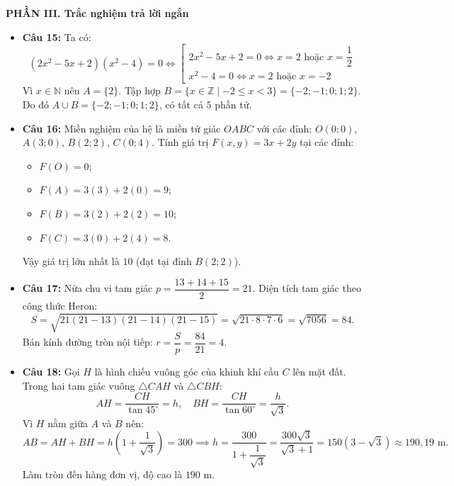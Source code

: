 \documentclass[12pt,a4paper]{article}
\begin{document}
\vspace{0.2cm}
\textbf{PHẦN III. Trắc nghiệm trả lời ngắn}
\begin{itemize}[leftmargin=0.6cm, itemsep=3pt]
    \item \textbf{Câu 15:} Ta có:
    \[
    (2x^2 - 5x + 2)(x^2 - 4) = 0 \iff \left[\begin{array}{l} 2x^2 - 5x + 2 = 0 \iff x = 2 \text{ hoặc } x = \dfrac{1}{2} \\ x^2 - 4 = 0 \iff x = 2 \text{ hoặc } x = -2 \end{array}\right.
    \]
    Vì $x \in \mathbb{N}$ nên $A = \{2\}$.
    Tập hợp $B = \{x \in \mathbb{Z} \mid -2 \le x < 3\} = \{-2; -1; 0; 1; 2\}$.
    Do đó $A \cup B = \{-2; -1; 0; 1; 2\}$, có tất cả $5$ phần tử.
    \item \textbf{Câu 16:} Miền nghiệm của hệ là miền tứ giác $OABC$ với các đỉnh:
    $O(0; 0)$, $A(3; 0)$, $B(2; 2)$, $C(0; 4)$.
    Tính giá trị $F(x, y) = 3x + 2y$ tại các đỉnh:
    \begin{itemize}
        \item $F(O) = 0$;
        \item $F(A) = 3(3) + 2(0) = 9$;
        \item $F(B) = 3(2) + 2(2) = 10$;
        \item $F(C) = 3(0) + 2(4) = 8$.
    \end{itemize}
    Vậy giá trị lớn nhất là $10$ (đạt tại đỉnh $B(2; 2)$).
    \item \textbf{Câu 17:} Nửa chu vi tam giác $p = \dfrac{13 + 14 + 15}{2} = 21$.
    Diện tích tam giác theo công thức Heron:
    \[
    S = \sqrt{21(21 - 13)(21 - 14)(21 - 15)} = \sqrt{21 \cdot 8 \cdot 7 \cdot 6} = \sqrt{7056} = 84.
    \]
    Bán kính đường tròn nội tiếp: $r = \dfrac{S}{p} = \dfrac{84}{21} = 4$.
    \item \textbf{Câu 18:} Gọi $H$ là hình chiếu vuông góc của khinh khí cầu $C$ lên mặt đất. Trong hai tam giác vuông $\triangle CAH$ và $\triangle CBH$:
    \[
    AH = \dfrac{CH}{\tan 45^\circ} = h, \quad BH = \dfrac{CH}{\tan 60^\circ} = \dfrac{h}{\sqrt{3}}.
    \]
    Vì $H$ nằm giữa $A$ và $B$ nên:
    \[
    AB = AH + BH = h\left(1 + \dfrac{1}{\sqrt{3}}\right) = 300 \implies h = \dfrac{300}{1 + \dfrac{1}{\sqrt{3}}} = \dfrac{300\sqrt{3}}{\sqrt{3}+1} = 150(3 - \sqrt{3}) \approx 190{,}19\text{ m}.
    \]
    Làm tròn đến hàng đơn vị, độ cao là $190\text{ m}$.
\end{itemize}
\end{document}
